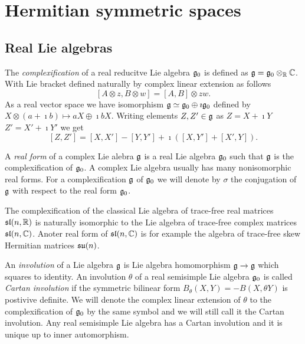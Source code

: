 \chapter{Hermitian symmetric spaces}\label{ch:hermitian}


\section{Real Lie algebras}

The \emph{complexification} of a real reducitve Lie algebra $\mathfrak{g}_0$ is defined as $\mathfrak{g} = \mathfrak{g}_0\otimes_{\mathbb{R}} \mathbb{C}$. With Lie bracket defined naturally by complex linear extension as follows
\[
 [A\otimes z, B\otimes w] = [A,B]\otimes zw.
\]
As a real vector space we have isomorphism $\mathfrak{g} \simeq \mathfrak{g}_0 \oplus \imath \mathfrak{g}_0$ defined by $X\otimes (a+\imath b) \mapsto aX \oplus \imath bX$. Writing elements $Z,Z'\in\mathfrak{g}$ as $Z = X + \imath Y$ $Z'=X'+\imath Y'$ we get \[[Z,Z'] = [X,X'] - [Y,Y'] + \imath \left( [X,Y'] + [X',Y]\right).\]

A \emph{real form} of a complex Lie alebra $\mathfrak{g}$ is a real Lie algebra $\mathfrak{g}_0$ such that $\mathfrak{g}$ is the complexification of $\mathfrak{g}_0$. A complex Lie algebra usually has many nonisomorphic real forms. For a complexification $\mathfrak{g}$ of $\mathfrak{g}_0$ we will denote by $\sigma$ the conjugation of $\mathfrak{g}$ with respect to the real form $\mathfrak{g}_0$.

\begin{example}
 The complexification of the classical Lie algebra of trace-free real matrices $\mathfrak{sl}(n,\mathbb{R})$ is naturally isomorphic to the Lie algebra of trace-free complex matrices $\mathfrak{sl}(n,\mathbb{C})$. Anoter real form of $\mathfrak{sl}(n,\mathbb{C})$ is for example the algebra of trace-free skew Hermitian  matrices  $\mathfrak{su}(n)$. %
\end{example}

An \emph{involution} of a Lie algebra $\mathfrak{g}$ is Lie algebra homomorphism $\mathfrak{g}\to\mathfrak{g}$ which squares to identity. An involution $\theta$ of a real semisimple Lie algebra $\mathfrak{g}_0$ is called \emph{Cartan involution} if the symmetric bilinear form $B_\theta(X,Y) = -B(X,\theta Y)$ is postivive definite. We will denote the complex linear extension of $\theta$ to the complexification of $\mathfrak{g}_0$ by the same symbol and we will still call it the Cartan involution. Any real semisimple Lie algebra has a Cartan involution and it is unique up to inner automorphism.

